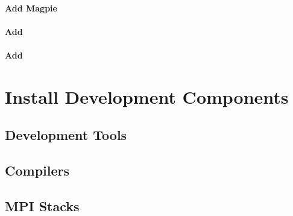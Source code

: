 \documentclass[letterpaper]{article}
\begin{document}
\paragraph{Add Magpie}


\paragraph{Add \conman{}} \label{sec:add_conman}


\paragraph{Add \nhc{}} \label{sec:add_nhc}



%
%


\section{Install \OHPC{} Development Components}


\subsection{Development Tools} \label{sec:install_dev_tools}


\vspace*{-0.15cm}
\subsection{Compilers} \label{sec:install_compilers}


\subsection{MPI Stacks} \label{sec:mpi}

\end{document}
